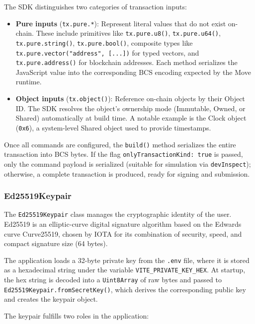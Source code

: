 \documentclass[12pt,a4paper]{article}
\begin{document}
The SDK distinguishes two categories of transaction inputs:

\begin{itemize}
    \item \textbf{Pure inputs} (\texttt{tx.pure.*}): Represent literal values that do not exist on-chain. These include primitives like \texttt{tx.pure.u8()}, \texttt{tx.pure.u64()}, \texttt{tx.pure.string()}, \texttt{tx.pure.bool()}, composite types like \texttt{tx.pure.vector("address", [...])} for typed vectors, and \texttt{tx.pure.address()} for blockchain addresses. Each method serializes the JavaScript value into the corresponding BCS encoding expected by the Move runtime.
    \item \textbf{Object inputs} (\texttt{tx.object()}): Reference on-chain objects by their Object ID. The SDK resolves the object's ownership mode (Immutable, Owned, or Shared) automatically at build time. A notable example is the Clock object (\texttt{0x6}), a system-level Shared object used to provide timestamps.
\end{itemize}


Once all commands are configured, the \texttt{build()} method serializes the entire transaction into BCS bytes. If the flag \texttt{onlyTransactionKind: true} is passed, only the command payload is serialized (suitable for simulation via \texttt{devInspect}); otherwise, a complete transaction is produced, ready for signing and submission.

\subsubsection{Ed25519Keypair}

The \texttt{Ed25519Keypair} class manages the cryptographic identity of the user. Ed25519 is an elliptic-curve digital signature algorithm based on the Edwards curve Curve25519, chosen by IOTA for its combination of security, speed, and compact signature size (64 bytes).

The application loads a 32-byte private key from the \texttt{.env} file, where it is stored as a hexadecimal string under the variable \texttt{VITE\_PRIVATE\_KEY\_HEX}. At startup, the hex string is decoded into a \texttt{Uint8Array} of raw bytes and passed to \texttt{Ed25519Keypair.fromSecretKey()}, which derives the corresponding public key and creates the keypair object.

The keypair fulfills two roles in the application:
\end{document}
